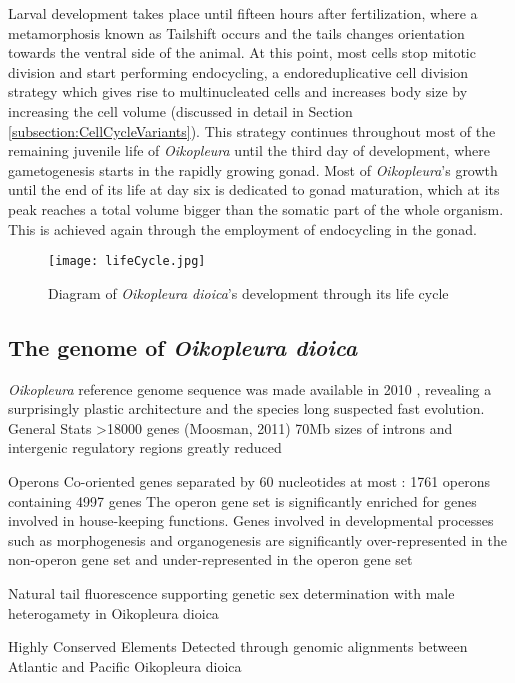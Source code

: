 \documentclass[11pt,twoside,a4paper]{report}
\begin{document}
		Larval development takes place until fifteen hours after fertilization, where a metamorphosis known as Tailshift occurs and the tails changes orientation towards the ventral side of the animal. At this point, most cells stop mitotic division and start performing endocycling, a endoreduplicative cell division strategy which gives rise to multinucleated cells and increases body size by increasing the cell volume (discussed in detail in Section \ref{subsection:CellCycleVariants}). This strategy continues throughout most of the remaining juvenile life of \textit{Oikopleura} until the third day of development, where gametogenesis starts in the rapidly growing gonad. Most of \textit{Oikopleura}'s growth until the end of its life at day six is dedicated to gonad maturation, which at its peak reaches a total volume bigger than the somatic part of the whole organism. This is achieved again through the employment of endocycling in the gonad.
		
		\begin{figure}[here]
			\centering
			\texttt{[image: lifeCycle.jpg]}
			\caption{Diagram of \textit{Oikopleura dioica}'s development through its life cycle}
			\label{fig:LifeCycle}
		\end{figure}
		

		\subsection{The genome of \textit{Oikopleura dioica}}
		\textit{Oikopleura} reference genome sequence was made available in 2010 \cite{}, revealing a surprisingly plastic architecture and the species long suspected fast evolution.
		General Stats
>18000 genes (Moosman, 2011)
70Mb
sizes of introns and intergenic regulatory regions greatly reduced

Operons
Co-oriented genes separated by 60 nucleotides at most : 1761 operons containing 4997 genes
The operon gene set is significantly enriched for genes involved in house-keeping functions.
Genes involved in developmental processes such as morphogenesis and organogenesis are significantly over-represented in the non-operon gene set and under-represented in the operon gene set

 
Natural tail fluorescence supporting genetic sex determination with male heterogamety in Oikopleura dioica

Highly Conserved Elements
Detected through genomic alignments between Atlantic and Pacific Oikopleura dioica
\end{document}
